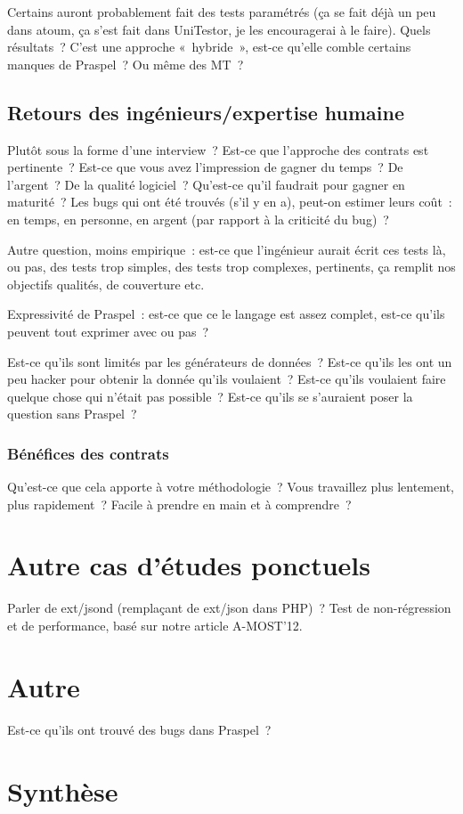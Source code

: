Certains auront probablement fait des tests paramétrés (ça se fait déjà un peu
dans atoum, ça s'est fait dans UniTestor, je les encouragerai à le faire). Quels
résultats~? C'est une approche «~hybride~», est-ce qu'elle comble certains
manques de Praspel~? Ou même des MT~?

\subsection{Retours des ingénieurs/expertise humaine}

Plutôt sous la forme d'une interview~? Est-ce que l'approche des contrats est
pertinente~? Est-ce que vous avez l'impression de gagner du temps~? De
l'argent~? De la qualité logiciel~? Qu'est-ce qu'il faudrait pour gagner en
maturité~? Les bugs qui ont été trouvés (s'il y en a), peut-on estimer leurs
coût~: en temps, en personne, en argent (par rapport à la criticité du bug)~?

Autre question, moins empirique~: est-ce que l'ingénieur aurait écrit ces tests
là, ou pas, des tests trop simples, des tests trop complexes, pertinents, ça
remplit nos objectifs qualités, de couverture etc.

Expressivité de Praspel~: est-ce que ce le langage est assez complet, est-ce
qu'ils peuvent tout exprimer avec ou pas~?

Est-ce qu'ils sont limités par les générateurs de données~? Est-ce qu'ils les
ont un peu hacker pour obtenir la donnée qu'ils voulaient~? Est-ce qu'ils
voulaient faire quelque chose qui n'était pas possible~? Est-ce qu'ils se
s'auraient poser la question sans Praspel~?

\subsubsection{Bénéfices des contrats}

Qu'est-ce que cela apporte à votre méthodologie~? Vous travaillez plus
lentement, plus rapidement~? Facile à prendre en main et à comprendre~?

\section{Autre cas d'études ponctuels}

Parler de ext/jsond (remplaçant de ext/json dans PHP)~? Test de non-régression
et de performance, basé sur notre article A-MOST'12.

\section{Autre}

Est-ce qu'ils ont trouvé des bugs dans Praspel~?


\section{Synthèse}
\label{section:experimentation:other}
